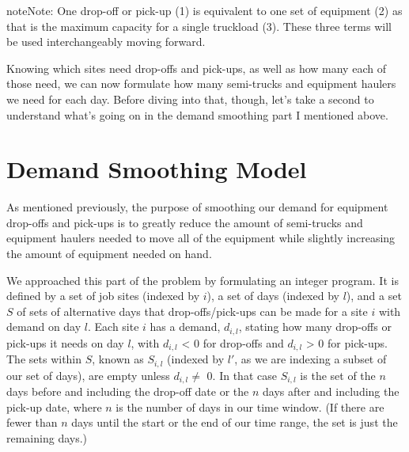 \documentclass[letterpaper,10pt,english]{sphinxmanual}
\begin{document}
\begin{sphinxadmonition}{note}{Note:}
One drop-off or pick-up (1) is equivalent to one set of equipment (2) as
that is the maximum capacity for a single truckload (3). These three
terms will be used interchangeably moving forward.
\end{sphinxadmonition}

Knowing which sites need drop-offs and pick-ups, as well as how many each
of those need, we can now formulate how many semi-trucks and equipment
haulers we need for each day. Before diving into that, though, let's take a
second to understand what's going on in the demand smoothing part I mentioned
above.


\section{Demand Smoothing Model}
\label{\detokenize{variation:demand-smoothing-model}}
As mentioned previously, the purpose of smoothing our demand for
equipment drop-offs and pick-ups is to greatly reduce the amount of
semi-trucks and equipment haulers needed to move all of the equipment while
slightly increasing the amount of equipment needed on hand.

We approached
this part of the problem by formulating an integer program. It is defined by
a set of job sites (indexed by \(i\)), a set of days (indexed by
\(l\)), and a set \(S\) of sets of alternative days that
drop-offs/pick-ups can be made for a site \(i\) with demand on day
\(l\). Each site \(i\) has a demand, \(d_{i,l}\), stating how
many drop-offs or pick-ups it needs on day \(l\), with \(d_{i,l}\) \textless{}
0 for drop-offs and \(d_{i,l}\) \textgreater{} 0 for pick-ups. The sets within
\(S\), known as \(S_{i,l}\) (indexed by \(l'\), as we are
indexing a subset of our set of days), are empty unless \(d_{i,l} \neq\)
0. In that case \(S_{i,l}\) is the set of the \(n\) days before and
including the drop-off date or the \(n\) days after and including the
pick-up date, where \(n\) is the number of days in our time window. (If
there are fewer than \(n\) days until the start or the end of our time
range, the set is just the remaining days.)
\end{document}
